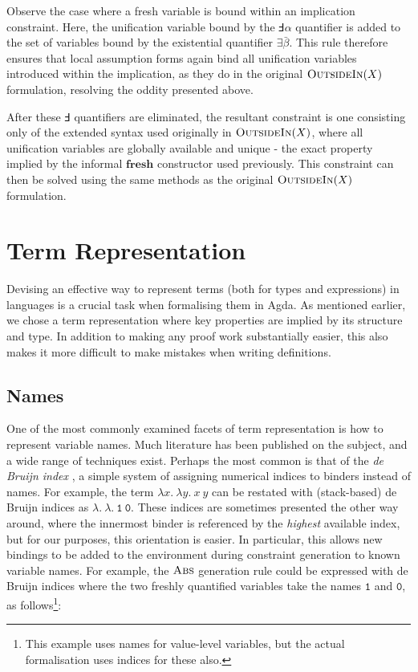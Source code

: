 \documentclass[a4paper]{jfp}
\newcommand{\outsidein}{\textsc{OutsideIn}(X)}
\begin{document}
\medskip

Observe the case where a fresh variable is bound within an implication constraint. Here, the unification variable bound by the $\Finv \alpha$ quantifier is added to the set of variables bound by the existential quantifier $\exists \bar{\beta}$. This rule therefore ensures that local assumption forms again bind all unification variables introduced within the implication, as they do in the original $\outsidein$ formulation, resolving the oddity presented above.

After these $\Finv$ quantifiers are eliminated, the resultant constraint is one consisting only of the extended syntax used originally in $\outsidein$, where all unification variables are globally available and unique - the exact property implied by the informal $\textbf{fresh}$ constructor used previously. This constraint can then be solved using the same methods as the original $\outsidein$ formulation.

\section{Term Representation}

Devising an effective way to represent terms (both for types and expressions) in languages is a crucial task when formalising them in Agda. As mentioned earlier, we chose a term representation where key properties are implied by its structure and type. In addition to making any proof work substantially easier, this also makes it more difficult to make mistakes when writing definitions. 

\subsection{Names}

One of the most commonly examined facets of term representation is how to represent variable names. Much literature has been published on the subject, and a wide range of techniques exist. Perhaps the most common is that of the \emph{de Bruijn index} \cite{deBruijn:1972tm}, a simple system of assigning numerical indices to binders instead of names. For example, the term $\lambda x.\ \lambda y.\ x\ y$ can be restated with (stack-based) de Bruijn indices as $\lambda.\ \lambda.\ \mathtt{1}\ \mathtt{0}$. These indices are sometimes presented the other way around, where the innermost binder is referenced by the \emph{highest} available index, but for our purposes, this orientation is easier. In particular, this allows new bindings to be added to the environment during constraint generation to known variable names. For example, the $\textsc{Abs}$ generation rule could be expressed with de Bruijn indices where the two freshly quantified variables take the names $\mathtt{1}$ and $\mathtt{0}$, as follows\footnote{This example uses names for value-level variables, but the actual formalisation uses indices for these also.}:
\end{document}
